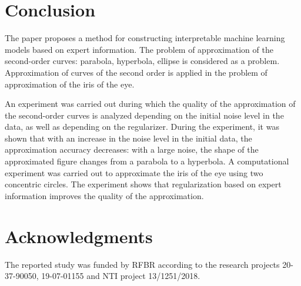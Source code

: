 \section{Conclusion}
\label{sec:6}
The paper proposes a method for constructing interpretable machine learning models based on expert information. The problem of approximation of the second-order curves: parabola, hyperbola, ellipse is considered as a problem. Approximation of curves of the second order is applied in the problem of approximation of the iris of the eye.

An experiment was carried out during which the quality of the approximation of the second-order curves is analyzed depending on the initial noise level in the data, as well as depending on the regularizer. During the experiment, it was shown that with an increase in the noise level in the initial data, the approximation accuracy decreases: with a large noise, the shape of the approximated figure changes from a parabola to a hyperbola.
A computational experiment was carried out to approximate the iris of the eye using two concentric circles. The experiment shows that regularization based on expert information improves the quality of the approximation.

\section{Acknowledgments}
\label{sec:7}
The reported study was funded by RFBR according to the research projects 20-37-90050, 19-07-01155 and NTI project 13/1251/2018.



%
%



